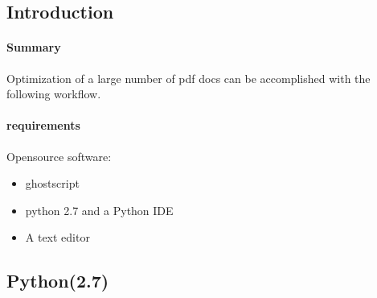 \documentclass[class=article , crop=false, titlepage, twoside, multi={itemize, figure, verbatim}, float=false]{standalone}
\title{}  %
\begin{document}

\ifstandalone
\maketitle %
\clearpage
\tableofcontents %
\clearpage
\fi

\clearpage

\subsection{Introduction}
\paragraph{Summary}
Optimization of a large number of pdf docs can be accomplished with the following workflow.
\paragraph{requirements}
Opensource software:
\begin{itemize}
\item ghostscript 
\item python 2.7 and a Python IDE 
\item A text editor
\end{itemize}
\subsection{Python(2.7)}
\end{document}
